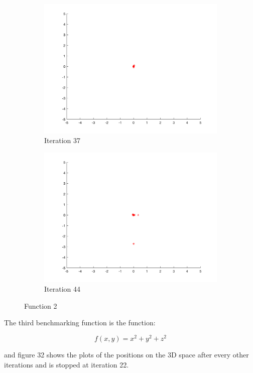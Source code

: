 \begin{figure}
\begin{subfigure}[b]{0.4\textwidth}
    \includegraphics[width=\textwidth]{img/smpl/sphr/loa-iter-37}
    \caption{Iteration 37}
    \label{fig:s2-iter-6}
  \end{subfigure}
  \begin{subfigure}[b]{0.4\textwidth}
    \includegraphics[width=\textwidth]{img/smpl/sphr/loa-iter-44}
    \caption{Iteration 44}
    \label{fig:s2-iter-7}
  \end{subfigure}
  \caption{Function 2}
\end{figure}


The third benchmarking function is the function:

$$
  f(x, y) = x^2 + y^2 + z^2
$$

and figure 32 shows the plots of the positions on the 3D space after every other iterations and is stopped at iteration 22.

